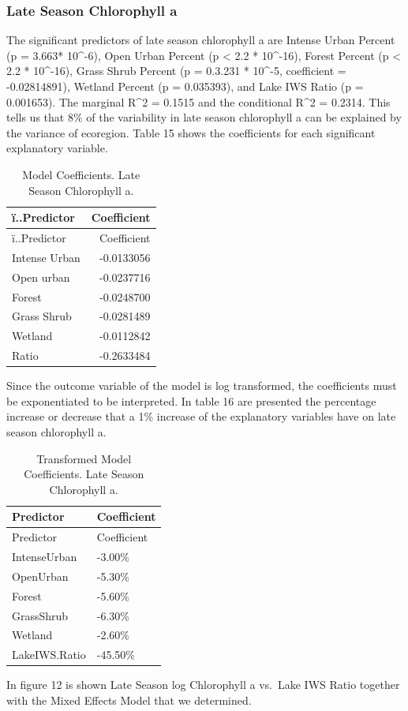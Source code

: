 \documentclass[12pt,]{article}
\begin{document}
\hypertarget{late-season-chlorophyll-a}{%
\subsubsection{Late Season Chlorophyll
a}\label{late-season-chlorophyll-a}}

The significant predictors of late season chlorophyll a are Intense
Urban Percent (p = 3.663* 10\^{}-6), Open Urban Percent (p \textless{}
2.2 * 10\^{}-16), Forest Percent (p \textless{} 2.2 * 10\^{}-16), Grass
Shrub Percent (p = 0.3.231 * 10\^{}-5, coefficient = -0.02814891),
Wetland Percent (p = 0.035393), and Lake IWS Ratio (p = 0.001653). The
marginal R\^{}2 = 0.1515 and the conditional R\^{}2 = 0.2314. This tells
us that 8\% of the variability in late season chlorophyll a can be
explained by the variance of ecoregion. Table 15 shows the coefficients
for each significant explanatory variable.

\begin{longtable}[]{@{}lr@{}}
\caption{Model Coefficients. Late Season Chlorophyll a.}\tabularnewline
\toprule
ï..Predictor & Coefficient\tabularnewline
\midrule
\endfirsthead
\toprule
ï..Predictor & Coefficient\tabularnewline
\midrule
\endhead
Intense Urban & -0.0133056\tabularnewline
Open urban & -0.0237716\tabularnewline
Forest & -0.0248700\tabularnewline
Grass Shrub & -0.0281489\tabularnewline
Wetland & -0.0112842\tabularnewline
Ratio & -0.2633484\tabularnewline
\bottomrule
\end{longtable}

Since the outcome variable of the model is log transformed, the
coefficients must be exponentiated to be interpreted. In table 16 are
presented the percentage increase or decrease that a 1\% increase of the
explanatory variables have on late season chlorophyll a.

\begin{longtable}[]{@{}ll@{}}
\caption{Transformed Model Coefficients. Late Season Chlorophyll
a.}\tabularnewline
\toprule
Predictor & Coefficient\tabularnewline
\midrule
\endfirsthead
\toprule
Predictor & Coefficient\tabularnewline
\midrule
\endhead
IntenseUrban & -3.00\%\tabularnewline
OpenUrban & -5.30\%\tabularnewline
Forest & -5.60\%\tabularnewline
GrassShrub & -6.30\%\tabularnewline
Wetland & -2.60\%\tabularnewline
LakeIWS.Ratio & -45.50\%\tabularnewline
\bottomrule
\end{longtable}

In figure 12 is shown Late Season log Chlorophyll a vs.~Lake IWS Ratio
together with the Mixed Effects Model that we determined.
\end{document}
